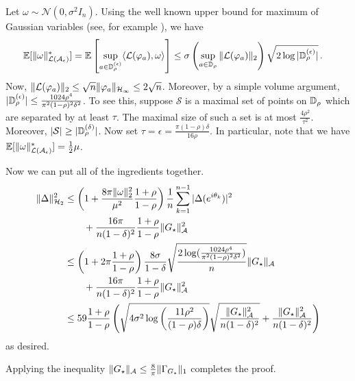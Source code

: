 Let $\omega \sim \mathcal{N}(0,\sigma^2 I_n)$. Using the well known upper bound for maximum of Gaussian variables (see, for example \cite{lr76}), we have
\begin{align*}
\operatorname{\mathbb{E}}[\|\omega\|_{\mathcal{L}(\mathcal{A}_\epsilon)}^*] &=	\operatorname{\mathbb{E}}\left[ \sup_{a\in\mathbb{D}_\rho^{(\epsilon)}} \langle \mathcal{L}(\varphi_a), \omega \rangle\right] \leq \sigma \left(\sup_{a\in \mathbb{D}_\rho}\|\mathcal{L}(\varphi_a)\|_2\right) \sqrt{2 \log |\mathbb{D}_\rho^{(\epsilon)}|}\,.
\end{align*}
Now, $\|\mathcal{L}(\varphi_a)\|_2 \leq \sqrt{n} \|\varphi_a\|_{\mathcal{H}_\infty}\leq 2 \sqrt{n}$.  Moreover, by a simple volume argument, $|\mathbb{D}_\rho^{(\epsilon)}| \leq \frac{1024 \rho^4}{\pi^2(1-\rho)^2\delta^2}$.  To see this, suppose $\mathcal{S}$ is a maximal set of points on $\mathbb{D}_\rho$ which are separated by at least $\tau$.  The maximal size of such a set is at most  $\frac{4\rho^2}{\tau^2}$. Moreover, $|\mathcal{S}|\geq |\mathbb{D}_\rho^{(\delta)}|$.  Now set $\tau = \epsilon=\tfrac{\pi (1-\rho) \delta}{16\rho}$.  In particular, note that we have $\operatorname{\mathbb{E}}[\|\omega\|^*_{\mathcal{L}(\mathcal{A}_\epsilon)}] =\tfrac{1}{2} \mu$.

Now we can put all of the ingredients together.
\begin{align*}
\|\Delta\|_{\mathcal{H}_2}^2  &\leq \left(1+\frac{8\pi \|\omega\|_2^2}{\mu^2}\frac{1+\rho}{1-\rho} \right)\frac{1}{n}\sum_{k=1}^{n-1} |\Delta(e^{i\theta_k})|^2\\
&\qquad + \frac{16\pi}{n(1-\delta)^2} \frac{1+\rho}{1-\rho}  \|G_\star\|_{\mathcal{A}}^2\\
&  \leq \left(1+2\pi \frac{1+\rho}{1-\rho} \right) \frac{8\sigma}{1-\delta} \sqrt{\frac{2\log(\frac{1024 \rho^4}{\pi^2(1-\rho)^2\delta^2})}{n}}\|G_\star\|_{\mathcal{A}} \\
&\qquad+ \frac{16\pi}{n(1-\delta)^2} \frac{1+\rho}{1-\rho}  \|G_\star\|_{\mathcal{A}}^2\\
&  \leq  59 \frac{1+\rho}{1-\rho} \left( \sqrt{4\sigma^2 \log\left(\frac{11 \rho^2}{(1-\rho)\delta}\right)}\sqrt{\frac{\|G_\star\|_{\mathcal{A}}^2}{n(1-\delta)^2} } + \frac{\|G_\star\|_{\mathcal{A}}^2}{n(1-\delta)^2}   \right)
\end{align*}
as desired.

Applying the inequality $\|G_\star\|_{\mathcal{A}}\leq \tfrac{8}{\pi}\|\Gamma_{G_\star}\|_1$ completes the proof.